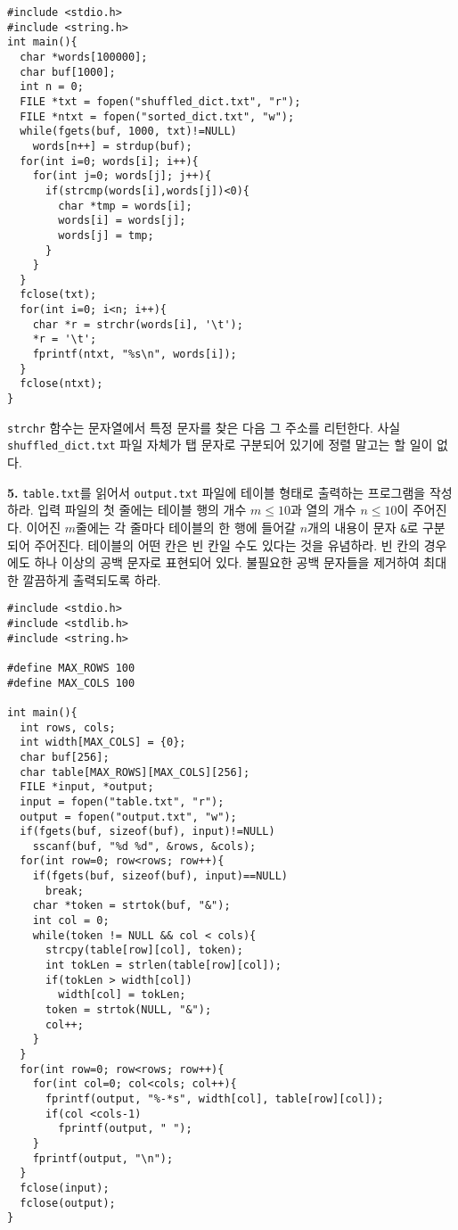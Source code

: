 \documentclass[a4paper,chapter,atbegshi]{oblivoir}
\begin{document}
\begin{lstlisting}[style=C]
#include <stdio.h>
#include <string.h>
int main(){
  char *words[100000];
  char buf[1000];
  int n = 0;
  FILE *txt = fopen("shuffled_dict.txt", "r");
  FILE *ntxt = fopen("sorted_dict.txt", "w");
  while(fgets(buf, 1000, txt)!=NULL)
    words[n++] = strdup(buf);
  for(int i=0; words[i]; i++){
    for(int j=0; words[j]; j++){
      if(strcmp(words[i],words[j])<0){
        char *tmp = words[i];
        words[i] = words[j];
        words[j] = tmp;
      }
    }
  }
  fclose(txt);
  for(int i=0; i<n; i++){
    char *r = strchr(words[i], '\t');
    *r = '\t';
    fprintf(ntxt, "%s\n", words[i]);
  }
  fclose(ntxt);
}
\end{lstlisting}
\texttt{strchr} 함수는 문자열에서 특정 문자를 찾은 다음 그 주소를 리턴한다.
사실 \texttt{shuffled\_dict.txt} 파일 자체가 탭 문자로 구분되어 있기에
정렬 말고는 할 일이 없다.
\hfill\break
\begin{mdframed}\textbf{5. }
  \texttt{table.txt}를 읽어서 \texttt{output.txt} 파일에 테이블 형태로
  출력하는 프로그램을 작성하라. 입력 파일의 첫 줄에는 테이블 행의 개수
  $m\leq10$과 열의 개수 $n\leq10$이 주어진다. 이어진 $m$줄에는 각 줄마다
  테이블의 한 행에 들어갈 $n$개의 내용이 문자 \texttt{\&}로 구분되어
  주어진다. 테이블의 어떤 칸은 빈 칸일 수도 있다는 것을 유념하라. 빈 칸의
  경우에도 하나 이상의 공백 문자로 표현되어 있다. 불필요한 공백 문자들을
  제거하여 최대한 깔끔하게 출력되도록 하라.
\end{mdframed}
\begin{lstlisting}[style=C]
#include <stdio.h>
#include <stdlib.h>
#include <string.h>

#define MAX_ROWS 100
#define MAX_COLS 100

int main(){
  int rows, cols;
  int width[MAX_COLS] = {0};
  char buf[256];
  char table[MAX_ROWS][MAX_COLS][256];
  FILE *input, *output;
  input = fopen("table.txt", "r");
  output = fopen("output.txt", "w");
  if(fgets(buf, sizeof(buf), input)!=NULL)
    sscanf(buf, "%d %d", &rows, &cols);
  for(int row=0; row<rows; row++){
    if(fgets(buf, sizeof(buf), input)==NULL)
      break;
    char *token = strtok(buf, "&");
    int col = 0;
    while(token != NULL && col < cols){
      strcpy(table[row][col], token);
      int tokLen = strlen(table[row][col]);
      if(tokLen > width[col])
        width[col] = tokLen;
      token = strtok(NULL, "&");
      col++;
    }
  }
  for(int row=0; row<rows; row++){
    for(int col=0; col<cols; col++){
      fprintf(output, "%-*s", width[col], table[row][col]);
      if(col <cols-1)
        fprintf(output, " ");
    }
    fprintf(output, "\n");
  }
  fclose(input);
  fclose(output);
}
\end{lstlisting}
\end{document}
